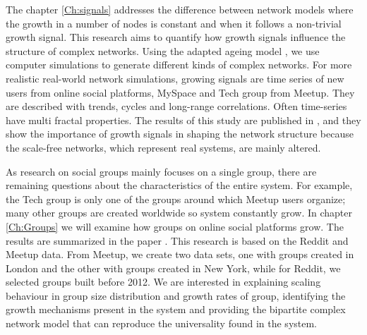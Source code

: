 The chapter \ref{Ch:signals} addresses the difference between network models where the growth in a number of nodes is constant and when it follows a non-trivial growth signal. This research aims to quantify how growth signals influence the structure of complex networks. Using the adapted ageing model \cite{hajra2004}, we use computer simulations to generate different kinds of complex networks. For more realistic real-world network simulations, growing signals are time series of new users from online social platforms, MySpace and Tech group from Meetup. They are described with trends, cycles and long-range correlations. Often time-series have multi fractal properties. The results of this study are published in \cite{vranic2021growth}, and they show the importance of growth signals in shaping the network structure because the scale-free networks, which represent real systems, are mainly altered. 

As research on social groups mainly focuses on a single group, there are remaining questions about the characteristics of the entire system. 
For example, the Tech group is only one of the groups around which Meetup users organize; many other groups are created worldwide so system constantly grow. 
In chapter \ref{Ch:Groups} we will examine how groups on online social platforms grow. The results are summarized in the paper  \cite{vranic2022universal}. This research is based on the Reddit and Meetup data. From Meetup, we create two data sets, one with groups created in London and the other with groups created in New York, while for Reddit, we selected groups built before 2012. We are interested in explaining scaling behaviour in group size distribution and growth rates of group, identifying the growth mechanisms present in the system and providing the bipartite complex network model that can reproduce the universality found in the system.

